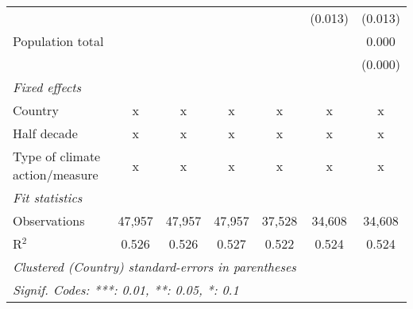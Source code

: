 \begin{tabular}{lcccccc}
                                                                                   &                &               &               &               & (0.013)       & (0.013)\\   
   Population total                                                                &                &               &               &               &               & 0.000\\   
                                                                                   &                &               &               &               &               & (0.000)\\   
   \emph{Fixed effects}\\
   Country                                                                         & x              & x             & x             & x             & x             & x\\  
   Half decade                                                                     & x              & x             & x             & x             & x             & x\\  
   Type of climate action/measure                                                  & x              & x             & x             & x             & x             & x\\  
   \midrule \emph{Fit statistics}\\
   Observations                                                                    & 47,957         & 47,957        & 47,957        & 37,528        & 34,608        & 34,608\\  
   R$^2$                                                                           & 0.526          & 0.526         & 0.527         & 0.522         & 0.524         & 0.524\\  
   \midrule
   \multicolumn{7}{l}{\emph{Clustered (Country) standard-errors in parentheses}}\\
   \multicolumn{7}{l}{\emph{Signif. Codes: ***: 0.01, **: 0.05, *: 0.1}}\\
\end{tabular}
\par\endgroup


